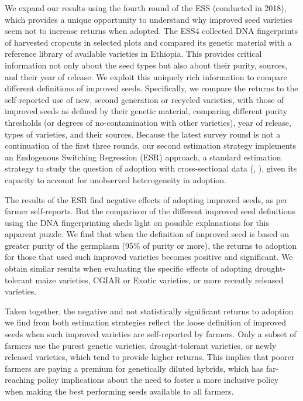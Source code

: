 \documentclass[11pt]{article}
\begin{document}
We expand our results using the fourth round of the ESS (conducted in 2018), which provides a unique opportunity to understand why improved seed varieties seem not to increase returns when adopted. The ESS4 collected DNA fingerprints of harvested cropcuts in selected plots and compared its genetic material with a reference library of available varieties in Ethiopia. This provides critical information not only about the seed types but also about their purity, sources, and their year of release. We exploit this uniquely rich information to compare different definitions of improved seeds. Specifically, we compare the returns to the self-reported use of new, second generation or recycled varieties, with those of improved seeds as defined by their genetic material, comparing different purity thresholds (or degrees of no-contamination with other varieties), year of release, types of varieties, and their sources. Because the latest survey round is not a continuation of the first three rounds, our second estimation strategy implements an Endogenous Switching Regression (ESR) approach, a standard estimation strategy to study the question of adoption with cross-sectional data (\citealt{Marenya2020-kb}, \citealt{Shiferaw2014-op}), given its capacity to account for unobserved heterogeneity in adoption. 

The results of the ESR find negative effects of adopting improved seeds, as per farmer self-reports. But the comparison of the different improved seed definitions using the DNA fingerprinting sheds light on possible explanations for this apparent puzzle. We find that when the definition of improved seed is based on greater purity of the germplasm (95\% of purity or more), the returns to adoption for those that used such improved varieties becomes positive and significant. We obtain similar results when evaluating the specific effects of adopting drought-tolerant maize varieties, CGIAR or Exotic varieties, or more recently released varieties.


Taken together, the negative and not statistically significant returns to adoption we find from both estimation strategies reflect the loose definition of improved seeds when such improved varieties are self-reported by farmers. Only a subset of farmers use the purest genetic varieties, drought-tolerant varieties, or newly released varieties, which tend to provide higher returns. This implies that poorer farmers are paying a premium for genetically diluted hybrids, which has far-reaching policy implications about the need to foster a more inclusive policy when making the best performing seeds available to all farmers.
\end{document}
